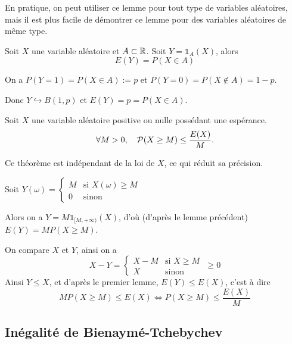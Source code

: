 \documentclass[a4paper,12pt]{article}
\begin{document}
\begin{remarque}
    En pratique, on peut utiliser ce lemme pour tout type de variables aléatoires, mais
    il est plus facile de démontrer ce lemme pour des variables aléatoires de même type.
\end{remarque}

\begin{lemme}{}{}
    Soit $X$ une variable aléatoire et $A \subset \R$. Soit $Y = \mathds{1}_A(X)$, alors
    $$
    E(Y) = P(X \in A)
    $$
\end{lemme}

\begin{demonstration}
    On a $P(Y = 1) = P(X \in A) := p$ et $P(Y = 0) = P(X \notin A) = 1 - p$. 

    Donc $Y \hookrightarrow B(1, p)$ et $E(Y) = p = P(X \in A)$.
\end{demonstration}

\begin{theoreme}{}{}
    Soit $X$ une variable aléatoire positive ou nulle possédant une espérance.
    $$
    \forall M > 0, \quad \P(X \geq M) \leq \frac{E(X)}{M}.
    $$ 
\end{theoreme}

\begin{remarque}
    Ce théorème est indépendant de la loi de $X$, ce qui réduit sa précision.
\end{remarque}

\begin{demonstration}
    Soit $Y(\omega) = \begin{cases}
        M & \text{si } X(\omega) \geq M \\
        0 & \text{sinon}
    \end{cases}$

    Alors on a $Y = M \mathds{1}_{[M, +\infty)}(X)$, d'où (d'après le lemme précédent) $E(Y) = M P(X \geq M)$.

    On compare $X$ et $Y$, ainsi on a
    $$
    X - Y = \begin{cases}
        X - M & \text{si } X \geq M \\
        X & \text{sinon}
    \end{cases} \; \geq 0
    $$
    Ainsi $Y \leq X$, et d'après le premier lemme, $E(Y) \leq E(X)$, c'est à dire
    $$
    M P(X \geq M) \leq E(X) \iff P(X \geq M) \leq \frac{E(X)}{M}
    $$
\end{demonstration}

\subsection{Inégalité de Bienaymé-Tchebychev}
\end{document}

